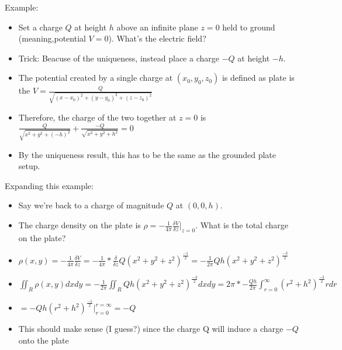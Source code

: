\documentclass[11pt, oneside]{article}   	%
\begin{document}
Example:

\begin{itemize}
\item Set a charge $Q$ at height $h$ above an infinite plane $z=0$ held to ground (meaning,potential $V = 0$). What's the electric field?
\item Trick: Beacuse of the uniqueness, instead place a charge $-Q$ at height $-h$.
\item The potential created by a single charge at $(x_0, y_0, z_0)$ is defined as  plate is the $V = \frac{Q}{\sqrt{(x-x_0)^2 + (y-y_0)^2 + (z-z_0)^2}}$
\item Therefore, the charge of the two together at $z=0$ is $\frac{Q}{\sqrt{x^2+y^2 + (-h)^2}} + \frac{-Q}{\sqrt{x^2 + y^2 + h^2}} = 0$
\item By the uniqueness result, this has to be the same as the grounded plate setup.
\end{itemize}

Expanding this example:
\begin{itemize}
\item Say we're back to a charge of magnitude $Q$ at $(0, 0, h)$.
\item The charge density on the plate is $\rho = -\frac{1}{4\pi} \frac{\delta V}{\delta z}|_{z=0}$.  What is the total charge on the plate?
\item $\rho(x,y) = -\frac{1}{4\pi} \frac{\delta V}{\delta z} = -\frac{1}{4\pi} * \frac{\delta}{\delta z}Q(x^2+y^2+z^2)^\frac{-1}{2} = -\frac{1}{2\pi}Qh(x^2+y^2+z^2)^\frac{-3}{2} $
\item  $\iint_R  \rho(x,y)  dx dy =  -\frac{1}{2\pi} \iint_R Qh(x^2+y^2+z^2)^\frac{-3}{2}  dx dy = 2\pi *-\frac{Qh}{2\pi} \int_{r=0}^{\infty} (r^2+h^2)^\frac{-3}{2} r dr$
\item $= -Qh (r^2+h^2)^\frac{-1}{2} |_{r=0}^{r=\infty} =- Q$
\item This should make sense (I guess?) since the charge Q will induce a charge $-Q$ onto the plate
\end{itemize}
\end{document}
